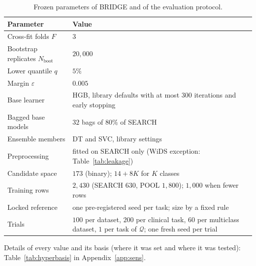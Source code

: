 \begin{table}[!t]
\centering
\scriptsize
{}
\setlength{\tabcolsep}{3pt}
\caption{Frozen parameters of BRIDGE and of the evaluation protocol.}
\label{tab:hyper}
\setlength{\tymin}{28pt}\begin{tabulary}{\columnwidth}{@{}lL@{}}
\toprule
Parameter & Value \\
\midrule
Cross-fit folds $F$ & $3$ \\
Bootstrap replicates $N_{\mathrm{boot}}$ & $20{,}000$ \\
Lower quantile $q$ & $5\%$ \\
Margin $\varepsilon$ & $0.005$ \\
Base learner & HGB, library defaults with at most 300 iterations and early stopping \\
Bagged base models & $32$ bags of $80\%$ of SEARCH \\
Ensemble members & DT and SVC, library settings \\
Preprocessing & fitted on SEARCH only (WiDS exception: Table~\ref{tab:leakage}) \\
Candidate space & $173$ (binary); $14+8K$ for $K$ classes \\
Training rows & $2{,}430$ (SEARCH $630$, POOL $1{,}800$); $1{,}000$ when fewer rows \\
Locked reference & one pre-registered seed per task; size by a fixed rule \\
Trials & $100$ per dataset, $200$ per clinical task, $60$ per multiclass dataset, $1$ per task of $\mathcal{Q}$; one fresh seed per trial \\
\bottomrule
\end{tabulary}

\vspace{2pt}
\parbox{\linewidth}{\justifying\scriptsize *Details of every value and its basis (where it was set and where it was tested): Table~\ref{tab:hyperbasis} in Appendix~\ref{app:sens}.}
\end{table}
